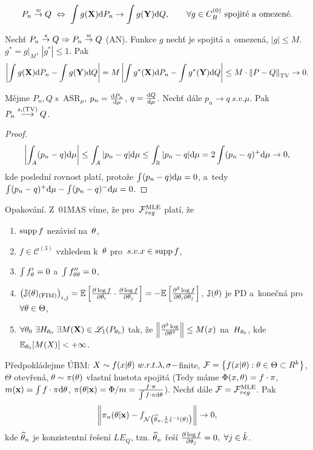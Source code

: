 \begin{remark}
	$$ P_n\stackrel{w}{\to} Q~\Leftrightarrow~\int g(\textbf{X})\mathrm{d} P_n\to\int g(\textbf{Y})\mathrm{d} Q,\qquad \forall g\in C_B^{(0)}\text{ spojité a~omezené.}$$
\end{remark}
\begin{theorem}
	Nechť $P_n\stackrel{s}{\to}Q\Rightarrow P_n\stackrel{w}{\to} Q$ (AN). Funkce $g$ nechť je spojitá a~omezená, $|g|\leq M$. $g^\ast =g|_M$, $|g^\ast|\leq 1$. Pak
	$$ \left| \int g(\textbf{X})\mathrm{d} P_n-\int g(\textbf{Y})\mathrm{d} Q \right|=M\left| \int g^\ast(\textbf{X})\mathrm{d} P_n-\int g^\ast(\textbf{Y})\mathrm{d} Q \right|\leq M\cdot \left\| P-Q\right\|_{\mathrm{TV}}\to0.$$
\end{theorem}
\begin{theorem}
	Mějme $P_n,Q$ s~ASR$_\mu$, $p_n=\frac{\mathrm{d} P_n}{\mathrm{d} \mu}$, $q=\frac{\mathrm{d} Q}{\mathrm{d} \mu}$. Nechť dále $p_n\to q~s.v.\mu$. Pak $P_n\stackrel{s,(\mathrm{TV})}{\longrightarrow}Q$. 
	\begin{proof}
		$$ \left| \int_A (p_n-q)\mathrm{d}\mu \right|\leq \int_A|p_n-q|\mathrm{d}\mu\leq \int_{\mathbb{R}}|p_n-q|\mathrm{d}\mu=2\int(p_n-q)^+\mathrm{d}\mu\to0,$$
		kde poslední rovnost platí, protože $\int(p_n-q)\mathrm{d}\mu=0$, a~tedy $\int(p_n-q)^+\mathrm{d}\mu-\int(p_n-q)^-\mathrm{d}\mu=0$.	\end{proof}
\end{theorem}
\begin{remark}
	Opakování. Z~01MAS víme, že pro~$\mathcal{F}_{reg}^{\mathrm{{\footnotesize MLE }}}$ platí, že \begin{enumerate}[1)]
		\item $\mathop{\mathrm{supp}} f$ nezávisí na~$\theta$,
		\item $f\in\mathcal{C}^{(3)}$ vzhledem k~$\theta$ pro~$s.v.x\in\mathop{\mathrm{supp}} f$,
		\item $\int f_\theta'=0$ a~$\int f_{\theta\theta}''=0$,
		\item $\left( \mathbb{J}(\theta)_{(\text{FIM})} \right)_{i,j}=\mathbb{E}\left[ \frac{\partial\log f}{\partial \theta_i}\cdot\frac{\partial\log f}{\partial \theta_j} \right]=-\mathbb{E}\left[ \frac{\partial^2 \log f}{\partial\theta_i \partial \theta_j} \right]$, $\mathbb{J}(\theta)$ je PD a~konečná pro~$\forall\theta\in\Theta$,
		\item $\forall\theta_0~\exists H_{\theta_0}~\exists M(\textbf{X})\in\mathscr{L}_1(P_{\theta_0})$ tak, že $\left\| \frac{\partial^3\log }{\partial \theta^3}\right\|\leq M(x)$ na~$H_{\theta_0}$, kde $\mathbb{E}_{\theta_0}[M(X)]<+\infty$.
	\end{enumerate}
\end{remark}
\begin{theorem}
	Předpokládejme ÚBM: $X\sim f(x|\theta)~w.r.t.\lambda,\sigma-$finite, $\mathcal{F}=\left\{ f(x|\theta):\theta\in\Theta\subset R^k \right\}$, $\Theta$ otevřená, $\theta\sim\pi(\theta)$ vlastní hustota spojitá (Tedy máme $\Phi(x,\theta)=f\cdot\pi$, $m(\textbf{x})=\int f\cdot \pi\mathrm{d}\theta$, $\pi(\theta|\textbf{x})=\Phi/m=\frac{f\cdot\pi}{\int f\cdot\pi\mathrm{d}\theta}$). Nechť dále $\mathcal{F}=\mathcal{F}_{reg}^{\mathrm{{\footnotesize MLE }}}$. Pak
	$$ \left\| \pi_n(\theta|\textbf{x})-f_{\mathcal{N}\left( \widehat{\theta}_n,\frac{1}{n}\mathbb{J}^{-1}(\theta) \right)} \right\|\to0,$$
	kde $\widehat{\theta}_n$ je konzistentní řešení $LE_Q$, tzn. $\widehat{\theta}_n$ řeší $\frac{\partial \log f}{\partial \theta_j}=0,~\forall j\in\hat{k}$.
\end{theorem}
